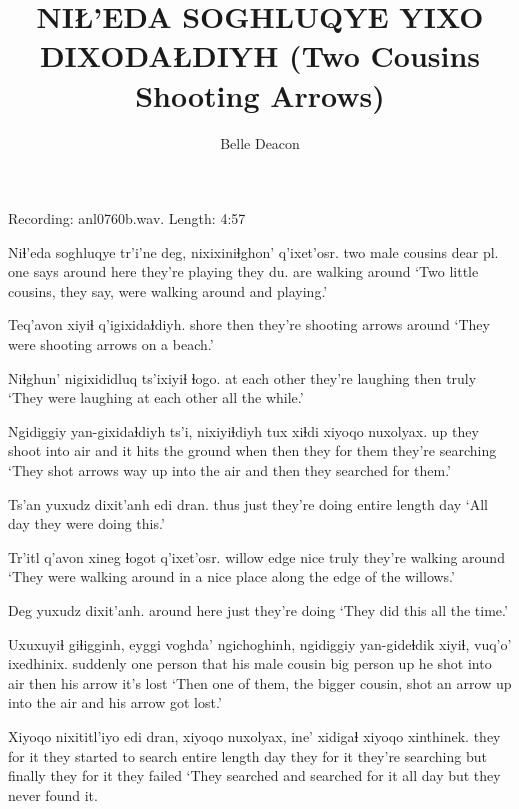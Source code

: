 \documentclass[12pt]{article}
\begin{document}
\title{NIŁ'EDA SOGHLUQYE YIXO DIXODAŁDIYH \newline(Two Cousins Shooting Arrows)}

\author{Belle Deacon}

\date{}

\maketitle

Recording:  anl0760b.wav.  Length:  4:57

\bigskip

\gll Niɬ'eda soghluqye tr'i'ne deg, nixixiniɬghon' q'ixet'osr. 
{two male cousins} {dear pl.} {one says} {around here} {they're playing} {they du. are walking around}
\glt `Two little cousins, they say, were walking around and playing.'
\glend

\gll Teq'avon xiyiɬ q'igixidaɬdiyh. 
shore then {they're shooting arrows around}
\glt `They were shooting arrows on a beach.' 
\glend

\gll Niɬghun' nigixididluq ts'ixiyiɬ ɬogo. 
{at each other} {they're laughing} then truly
\glt `They were laughing at each other all the while.' 
\glend

\gll Ngidiggiy yan-gixidaɬdiyh ts'i, nixiyiɬdiyh tux xiɬdi xiyoqo nuxolyax. 
up {they shoot into air} and {it hits the ground} when then {they for them} {they're searching}
\glt `They shot arrows way up into the air and then they searched for them.' 
\glend

\gll Ts'an yuxudz dixit'anh edi dran. 
thus just {they're doing} {entire length} {day}
\glt `All day they were doing this.' 
\glend

\gll Tr'itl q'avon xineg ɬogot q'ixet'osr. 
willow edge nice truly {they're walking around}
\glt `They were walking around in a nice place along the edge of the willows.' 
\glend

\gll Deg yuxudz dixit'anh. 
{around here} just {they're doing}
\glt `They did this all the time.' 
\glend

\gll Uxuxuyiɬ giɬigginh, eyggi voghda' ngichoghinh, ngidiggiy yan-gideɬdik xiyiɬ, vuq'o' ixedhinix. 
suddenly {one person} that {his male cousin} {big person} up {he shot into air} then {his arrow} {it's lost}
\glt `Then one of them, the bigger cousin, shot an arrow up into the air and his arrow got lost.' 
\glend

\gll Xiyoqo nixititl'iyo edi dran, xiyoqo nuxolyax, ine' xidigaɬ xiyoqo xinthinek. 
{they for it} {they started to search} {entire length} {day} {they for it} {they're searching} but finally {they for it} {they failed}
\glt `They searched and searched for it all day but they never found it. 
\glend
\end{document}
